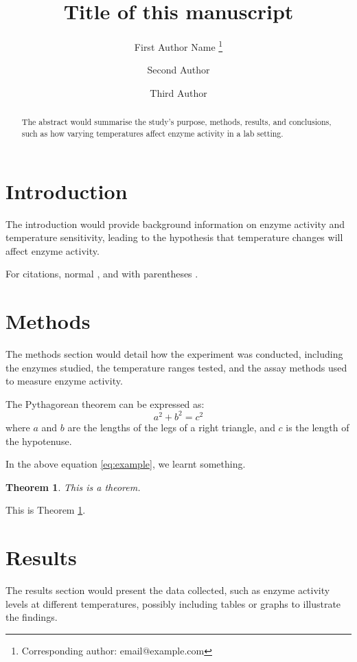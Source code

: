 \documentclass[a4paper]{article} 	%
\title{Title of this manuscript}
\author[1]{First Author Name \thanks{Corresponding author: email@example.com}}
\author[1,2]{Second Author}
\author[2]{Third Author}
\affil[1]{Affiliation one}
\affil[2]{Affiliation two}
\date{}
\newtheorem{theorem}{Theorem}
\begin{document}
\maketitle


\begin{abstract}
The abstract would summarise the study's purpose, methods, results, and conclusions, such as how varying temperatures affect enzyme activity in a lab setting.
\end{abstract}

\section{Introduction}
The introduction would provide background information on enzyme activity and temperature sensitivity, leading to the hypothesis that temperature changes will affect enzyme activity. 

For citations, normal \textcite{einstein1905, Cressie1999Classes}, and with parentheses \parencite{Abramowitz1974Handbook}.

\section{Methods}
The methods section would detail how the experiment was conducted, including the enzymes studied, the temperature ranges tested, and the assay methods used to measure enzyme activity.

The Pythagorean theorem can be expressed as:
\begin{equation}\label{eq:example}
    a^2 + b^2 = c^2
\end{equation}
where $a$ and $b$ are the lengths of the legs of a right triangle, and $c$ is the length of the hypotenuse.

In the above equation \eqref{eq:example}, we learnt something. 

\begin{theorem}\label{th:example}
This is a theorem.
\end{theorem}

This is Theorem \ref{th:example}. 



\section{Results}
The results section would present the data collected, such as enzyme activity levels at different temperatures, possibly including tables or graphs to illustrate the findings.
\end{document}

